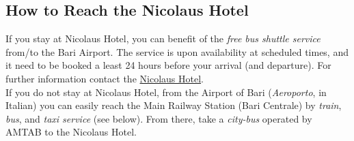 \documentclass[
	openany, %
	parskip=full, %
	12pt, %
	a4paper, %
]{conferencebooklet} %
\begin{document}
\subsection*{How to Reach the Nicolaus Hotel}
\vspace{-5mm}
If you stay at Nicolaus Hotel, you can benefit of the \textit{free bus shuttle service} from/to the Bari Airport. The service is upon availability at scheduled times, and it need to be booked a least 24 hours before your arrival (and departure). For further information contact the \color{blue}\href{https://www.thenicolaushotel.com/en}{Nicolaus Hotel}\color{black}. \\
If you do not stay at Nicolaus Hotel, from the Airport of Bari (\textit{Aeroporto}, in Italian) you can easily reach the Main Railway Station (Bari Centrale) by \textit{train}, \textit{bus}, and \textit{taxi service} (see below). From there, take a \textit{city-bus} operated by AMTAB to the Nicolaus Hotel.
\end{document}
